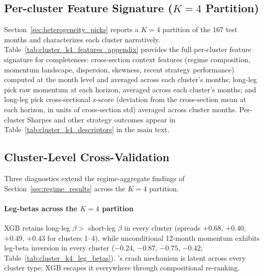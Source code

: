 \subsection{Per-cluster Feature Signature ($K=4$ Partition)}\label{app:cluster_k4_features}

Section~\ref{sec:heterogeneity_picks} reports a $K=4$ partition of the 167 test months and characterizes each cluster narratively. Table~\ref{tab:cluster_k4_features_appendix} provides the full per-cluster feature signature for completeness: cross-section context features (regime composition, momentum landscape, dispersion, skewness, recent strategy performance) computed at the month level and averaged across each cluster's months; long-leg pick raw momentum at each horizon, averaged across each cluster's months; and long-leg pick cross-sectional z-score (deviation from the cross-section mean at each horizon, in units of cross-section std) averaged across cluster months. Per-cluster Sharpes and other strategy outcomes appear in Table~\ref{tab:cluster_k4_descriptors} in the main text.



\subsection{Cluster-Level Cross-Validation}\label{app:cluster_cross_validation}

Three diagnostics extend the regime-aggregate findings of Section~\ref{sec:regime_results} across the $K=4$ partition.

\paragraph{Leg-betas across the $K=4$ partition}
XGB retains long-leg $\beta >$ short-leg $\beta$ in every cluster (spreads $+0.68$, $+0.40$, $+0.49$, $+0.43$ for clusters 1--4), while unconditional 12-month momentum exhibits leg-beta inversion in every cluster ($-0.24$, $-0.87$, $-0.75$, $-0.42$; Table~\ref{tab:cluster_k4_leg_betas}). \citet{DanielMoskowitz2016}'s crash mechanism is latent across every cluster type; XGB escapes it everywhere through compositional re-ranking.



